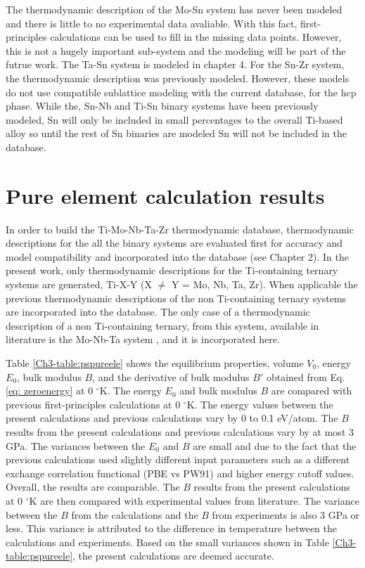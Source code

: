 The thermodynamic description of the Mo-Sn system has never been modeled and there is little to no experimental data avaliable. With this fact, first-principles calculations can be used to fill in the missing data points. However, this is not a hugely important sub-system and the modeling will be part of the futrue work. The Ta-Sn system is modeled in chapter 4. For the Sn-Zr system, the thermodynamic description was previously modeled. However, these models do not use compatible sublattice modeling with the current database, for the hcp phase. While the, Sn-Nb and Ti-Sn binary systems have been previously modeled, Sn will only be included in small percentages to the overall Ti-based alloy so until the rest of Sn binaries are modeled Sn will not be included in the database.

\section{Pure element calculation results}

In order to build the Ti-Mo-Nb-Ta-Zr thermodynamic database, thermodynamic descriptions for the all the binary systems are evaluated first for accuracy and model compatibility and incorporated into the database (see Chapter 2). In the present work, only thermodynamic descriptions for the Ti-containing ternary systems are generated, Ti-X-Y (X $\neq$ Y = Mo, Nb, Ta, Zr). When applicable the previous thermodynamic descriptions of the non Ti-containing ternary systems are incorporated into the database. The only case of a thermodynamic description of a non Ti-containing ternary, from this system, available in literature is the Mo-Nb-Ta system \cite{Xiong2004}, and it is incorporated here.

Table \ref{Ch3-table:pspureele} shows the equilibrium properties, volume $V_{0}$, energy $E_{0}$, bulk modulus $B$, and the derivative of bulk modulus $B'$ obtained from Eq. \ref{eq: zeroenergy} at 0 $^{\circ}$K. The energy $E_{0}$ and bulk modulus $B$ are compared with previous first-principles calculations at 0 $^{\circ}$K. The energy values between the present calculations and previous calculations vary by 0 to 0.1 eV/atom. The $B$ results from the present calculations and previous calculations vary by at most 3 GPa. The variances between the $E_{0}$ and $B$ are small and due to the fact that the previous calculations used slightly different input parameters such as a different exchange correlation functional (PBE vs PW91) and higher energy cutoff values. Overall, the results are comparable. The $B$ results from the present calculations at 0 $^{\circ}$K are then compared with experimental values from literature. The variance between the $B$ from the calculations and the $B$ from experiments is also 3 GPa or less. This variance is attributed to the difference in temperature between the calculations and experiments. Based on the small variances shown in Table \ref{Ch3-table:pspureele}, the present calculations are deemed accurate. 


